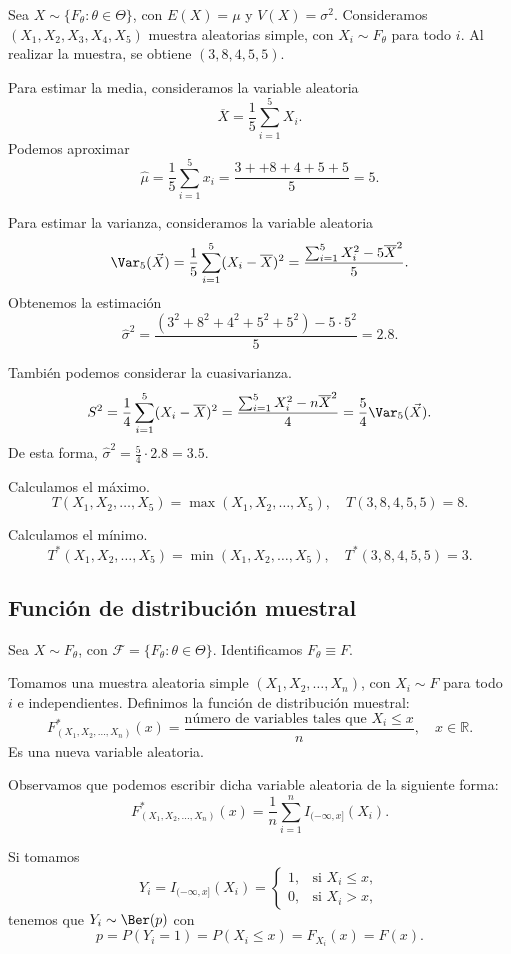 \begin{example}
    Sea $X \sim \{F_\theta : \theta \in \Theta\}$, con $E(X) = \mu$ y $V(X) = \sigma^2$.
    Consideramos $(X_1, X_2, X_3, X_4, X_5)$ muestra aleatorias simple, con $X_i \sim F_\theta$ para todo $i$.
    Al realizar la muestra, se obtiene $(3, 8, 4, 5, 5)$.

    Para estimar la media, consideramos la variable aleatoria
    $$\overline{X} = \frac{1}{5} \sum_{i=1}^5 X_i.$$
    Podemos aproximar
    $$\hat{\mu} = \frac{1}{5} \sum_{i=1}^5 x_i = \frac{3++8+4+5+5}{5} = 5.$$

    Para estimar la varianza, consideramos la variable aleatoria
    $$\Var_5(\vec{X}) = \frac{1}{5} \sum_{i=1}^5 (X_i - \overline{X})^2 = \frac{\sum_{i=1}^5 X_i^2 - 5\overline{X}^2}{5}.$$
    Obtenemos la estimación
    $$\hat{\sigma}^2 = \frac{(3^2+8^2+4^2+5^2+5^2) - 5 \cdot 5^2}{5} = 2.8.$$

    También podemos considerar la cuasivarianza.
    $$S^2 = \frac{1}{4} \sum_{i=1}^5 (X_i - \overline{X})^2 = \frac{\sum_{i=1}^5 X_i^2 - n\overline{X}^2}{4} = \frac{5}{4} \Var_5(\vec{X}).$$
    De esta forma, $\hat{\sigma}^2 = \frac{5}{4} \cdot 2.8 = 3.5$.

    Calculamos el máximo.
    $$T(X_1, X_2, \dots, X_5) = \max(X_1, X_2, \dots, X_5), \quad T(3, 8, 4, 5, 5) = 8.$$

    Calculamos el mínimo.
    $$T^\ast(X_1, X_2, \dots, X_5) = \min(X_1, X_2, \dots, X_5), \quad T^\ast(3, 8, 4, 5, 5) = 3.$$
\end{example}

\subsection{Función de distribución muestral}

Sea $X \sim F_{\theta}$, con $\mathcal{F} = \{F_{\theta} : \theta \in \Theta\}$.
Identificamos $F_{\theta} \equiv F$.

Tomamos una muestra aleatoria simple $(X_1, X_2, \dots, X_n)$, con $X_i \sim F$ para todo $i$ e independientes.
Definimos la función de distribución muestral:
$$F_{(X_1, X_2, \dots, X_n)}^\ast(x) = \frac{\text{número de variables tales que } X_i \leq x}{n}, \quad x \in \mathbb{R}.$$
Es una nueva variable aleatoria.

Observamos que podemos escribir dicha variable aleatoria de la siguiente forma:
$$F_{(X_1, X_2, \dots, X_n)}^\ast(x) = \frac{1}{n} \sum_{i=1}^{n} I_{(-\infty, x]}(X_i).$$

Si tomamos
$$Y_i = I_{(-\infty, x]}(X_i) = \begin{cases}
        1, & \text{si } X_i \leq x, \\
        0, & \text{si } X_i > x,
    \end{cases}$$
tenemos que $Y_i \sim \Ber(p)$ con
$$p = P(Y_i = 1) = P(X_i \leq x) = F_{X_i}(x) = F(x).$$

